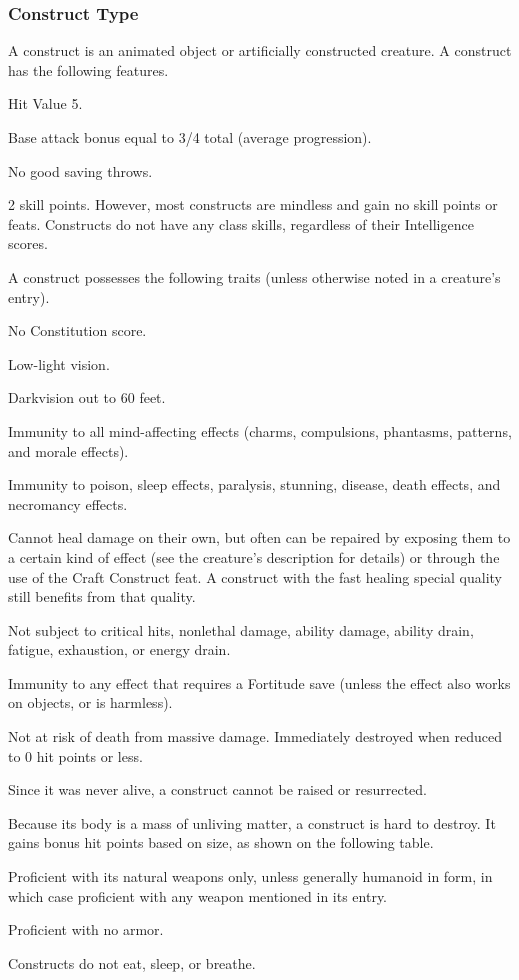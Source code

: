 \subsubsection{Construct Type} A construct is an animated object or artificially constructed creature.
 A construct has the following features.
\begin{itemize*}
\item Hit Value 5.
\item Base attack bonus equal to 3/4 total  (average progression).
\item No good saving throws.
\item 2 skill points. However, most constructs are mindless and gain no skill points or feats. Constructs do not have any class skills, regardless of their Intelligence scores.
\end{itemize*}
 A construct possesses the following traits (unless otherwise noted in a creature's entry).
\begin{itemize*}
\item No Constitution score.
\item Low-light vision.
\item Darkvision out to 60 feet.
\item Immunity to all mind-affecting effects (charms, compulsions, phantasms, patterns, and morale effects).
\item Immunity to poison, sleep effects, paralysis, stunning, disease, death effects, and necromancy effects.
\item Cannot heal damage on their own, but often can be repaired by exposing them to a certain kind of effect (see the creature's description for details) or through the use of the Craft Construct feat. A construct with the fast healing special quality still benefits from that quality.
\item Not subject to critical hits, nonlethal damage, ability damage, ability drain, fatigue, exhaustion, or energy drain.
\item Immunity to any effect that requires a Fortitude save (unless the effect also works on objects, or is harmless).
\item Not at risk of death from massive damage. Immediately destroyed when reduced to 0 hit points or less.
\item Since it was never alive, a construct cannot be raised or resurrected.
\item Because its body is a mass of unliving matter, a construct is hard to destroy. It gains bonus hit points based on size, as shown on the following table.
\item Proficient with its natural weapons only, unless generally humanoid in form, in which case proficient with any weapon mentioned in its entry.
\item Proficient with no armor.
\item Constructs do not eat, sleep, or breathe.
\end{itemize*}

